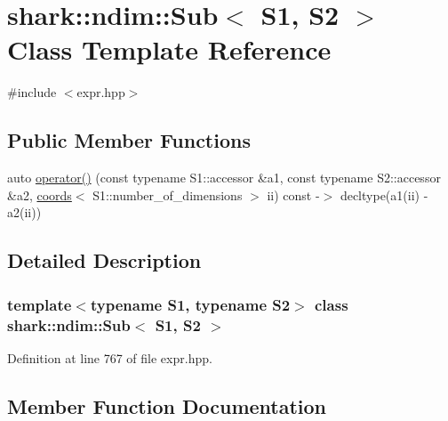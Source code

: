 \hypertarget{classshark_1_1ndim_1_1_sub}{}\section{shark\+:\+:ndim\+:\+:Sub$<$ S1, S2 $>$ Class Template Reference}
\label{classshark_1_1ndim_1_1_sub}


{\ttfamily \#include $<$expr.\+hpp$>$}

\subsection*{Public Member Functions}
\begin{DoxyCompactItemize}
\item 
auto \hyperlink{classshark_1_1ndim_1_1_sub_a1402dac70f7b2cb17cda1e486b3b8a8c}{operator()} (const typename S1\+::accessor \&a1, const typename S2\+::accessor \&a2, \hyperlink{structshark_1_1ndim_1_1coords}{coords}$<$ S1\+::number\+\_\+of\+\_\+dimensions $>$ ii) const -\/$>$ decltype(a1(ii) -\/ a2(ii))
\end{DoxyCompactItemize}


\subsection{Detailed Description}
\subsubsection*{template$<$typename S1, typename S2$>$\newline
class shark\+::ndim\+::\+Sub$<$ S1, S2 $>$}



Definition at line 767 of file expr.\+hpp.



\subsection{Member Function Documentation}
\hypertarget{classshark_1_1ndim_1_1_sub_a1402dac70f7b2cb17cda1e486b3b8a8c}{}\label{classshark_1_1ndim_1_1_sub_a1402dac70f7b2cb17cda1e486b3b8a8c} 
